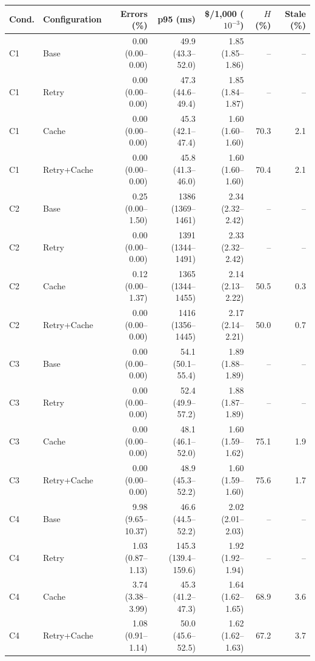 \documentclass[10pt]{article}
\begin{document}
\begin{table}[p]
\centering
\footnotesize
\begin{tabular}{@{}llrrrrr@{}}
\toprule
\textbf{Cond.} & \textbf{Configuration} & \textbf{Errors (\%)} & \textbf{p95 (ms)} &
  \textbf{\$/1{,}000 ($10^{-3}$)} & \textbf{$H$ (\%)} & \textbf{Stale (\%)} \\
\midrule
C1 & Base        & 0.00 (0.00--0.00)  & 49.9 (43.3--52.0)   & 1.85 (1.85--1.86) & --    & --   \\
C1 & Retry       & 0.00 (0.00--0.00)  & 47.3 (44.6--49.4)   & 1.85 (1.84--1.87) & --    & --   \\
C1 & Cache       & 0.00 (0.00--0.00)  & 45.3 (42.1--47.4)   & 1.60 (1.60--1.60) & 70.3  & 2.1  \\
C1 & Retry+Cache & 0.00 (0.00--0.00)  & 45.8 (41.3--46.0)   & 1.60 (1.60--1.60) & 70.4  & 2.1  \\
\midrule
C2 & Base        & 0.25 (0.00--1.50)  & 1386 (1369--1461)   & 2.34 (2.32--2.42) & --    & --   \\
C2 & Retry       & 0.00 (0.00--0.00)  & 1391 (1344--1491)   & 2.33 (2.32--2.42) & --    & --   \\
C2 & Cache       & 0.12 (0.00--1.37)  & 1365 (1344--1455)   & 2.14 (2.13--2.22) & 50.5  & 0.3  \\
C2 & Retry+Cache & 0.00 (0.00--0.00)  & 1416 (1356--1445)   & 2.17 (2.14--2.21) & 50.0  & 0.7  \\
\midrule
C3 & Base        & 0.00 (0.00--0.00)  & 54.1 (50.1--55.4)   & 1.89 (1.88--1.89) & --    & --   \\
C3 & Retry       & 0.00 (0.00--0.00)  & 52.4 (49.9--57.2)   & 1.88 (1.87--1.89) & --    & --   \\
C3 & Cache       & 0.00 (0.00--0.00)  & 48.1 (46.1--52.0)   & 1.60 (1.59--1.62) & 75.1  & 1.9  \\
C3 & Retry+Cache & 0.00 (0.00--0.00)  & 48.9 (45.3--52.2)   & 1.60 (1.59--1.60) & 75.6  & 1.7  \\
\midrule
C4 & Base        & 9.98 (9.65--10.37) & 46.6 (44.5--52.2)   & 2.02 (2.01--2.03) & --    & --   \\
C4 & Retry       & 1.03 (0.87--1.13)  & 145.3 (139.4--159.6) & 1.92 (1.92--1.94) & --   & --   \\
C4 & Cache       & 3.74 (3.38--3.99)  & 45.3 (41.2--47.3)   & 1.64 (1.62--1.65) & 68.9  & 3.6  \\
C4 & Retry+Cache & 1.08 (0.91--1.14)  & 50.0 (45.6--52.5)   & 1.62 (1.62--1.63) & 67.2  & 3.7  \\

\end{tabular}
\end{table}
\end{document}
